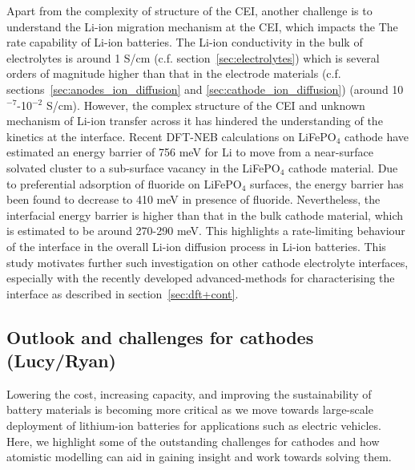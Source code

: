\documentclass[../main.tex]{subfiles}
\begin{document}
Apart from the complexity of structure of the CEI, another challenge is to understand the Li-ion migration mechanism at the CEI, which impacts the The rate capability of Li-ion batteries. The Li-ion conductivity in the bulk of electrolytes is around 1 S/cm (c.f. section~\ref{sec:electrolytes}) which is several orders of magnitude higher than that in the electrode materials (c.f. sections~\ref{sec:anodes_ion_diffusion} and \ref{sec:cathode_ion_diffusion}) (around 10$^{-7}$-10$^{-2}$ S/cm).\cite{park2010review, VanDerVen2013} However, the complex structure of the CEI and unknown mechanism of Li-ion transfer across it has hindered the understanding of the kinetics at the interface. Recent DFT-NEB calculations on LiFePO$_4$ cathode have estimated an energy barrier of 756 meV for Li to move from a near-surface solvated cluster to a sub-surface vacancy in the LiFePO$_4$ cathode material.\cite{Bhandari2019} Due to preferential adsorption of fluoride on LiFePO$_4$ surfaces,\cite{Edstrom2004, Bhandari2020} the energy barrier has been found to decrease to 410 meV in presence of fluoride. Nevertheless, the interfacial energy barrier is higher than that in the bulk cathode material, which is estimated to be around 270-290 meV.\cite{Morgan2004,Dathar2011} This highlights a rate-limiting behaviour of the interface in the overall Li-ion diffusion process in Li-ion batteries. This study motivates further such investigation on other cathode electrolyte interfaces, especially with the recently developed advanced-methods for characterising the interface as described in section~\ref{sec:dft+cont}.  

\subsection{Outlook and challenges for cathodes (Lucy/Ryan)}
Lowering the cost, increasing capacity, and improving the sustainability of battery materials is becoming more critical as we move towards large-scale deployment of lithium-ion batteries for applications such as electric vehicles. \cite{dunn2011electrical} Here, we highlight some of the outstanding challenges for cathodes and how atomistic modelling can aid in gaining insight and work towards solving them.
\end{document}
